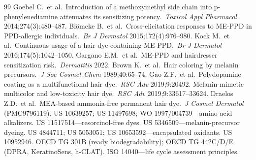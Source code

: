 \documentclass[11pt,a4paper]{article}
\begin{document}
\begin{thebibliography}{99}
 Goebel C.\ et al.\ Introduction of a methoxymethyl side chain into p-phenylenediamine attenuates its sensitizing potency.\ \textit{Toxicol Appl Pharmacol} 2014;274(3):480--487.
 Bl\"omeke B.\ et al.\ Cross-elicitation responses to ME-PPD in PPD-allergic individuals.\ \textit{Br J Dermatol} 2015;172(4):976--980.
 Kock M.\ et al.\ Continuous usage of a hair dye containing ME-PPD.\ \textit{Br J Dermatol} 2016;174(5):1042--1050.
 Gargano E.M.\ et al.\ ME-PPD and hairdresser sensitization risk.\ \textit{Dermatitis} 2022.
 Brown K.\ et al.\ Hair coloring by melanin precursors.\ \textit{J Soc Cosmet Chem} 1989;40:65--74.
 Gao Z.F.\ et al.\ Polydopamine coating as a multifunctional hair dye.\ \textit{RSC Adv} 2019;9:20492.
 Melanin-mimetic multicolor and low-toxicity hair dye.\ \textit{RSC Adv} 2019;9:33617--33624.
 Draelos Z.D.\ et al.\ MEA-based ammonia-free permanent hair dye.\ \textit{J Cosmet Dermatol} (PMC9796119).
 US 10639257; US 11497698; WO 1997/004739---amino-acid alkalizers.
 US 11517514---resorcinol-free dyes.
 US 5346509---melanin-precursor dyeing.
 US 4844711; US 5053051; US 10653592---encapsulated oxidants.
 US 10952946.
 OECD TG 301B (ready biodegradability); OECD TG 442C/D/E (DPRA, KeratinoSens, h-CLAT).
 ISO 14040---life cycle assessment principles.
\end{thebibliography}
\end{document}
